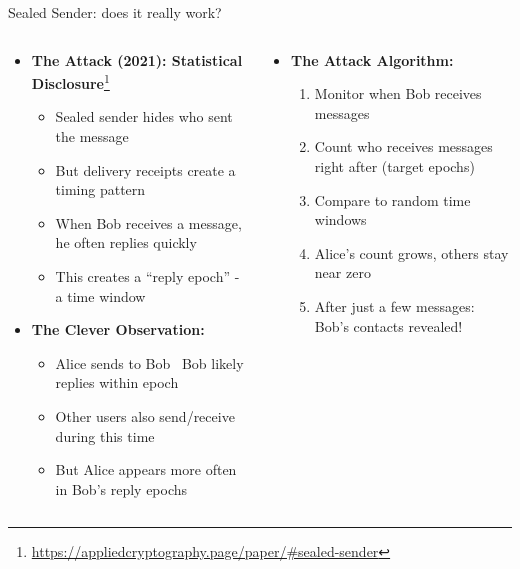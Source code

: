 \documentclass[aspectratio=169, lualatex, handout]{beamer}
\begin{document}
\begin{frame}{Sealed Sender: does it really work?}
	\begin{columns}[c]
		\begin{column}{0.6\textwidth}
			\begin{itemize}
				\item \textbf{The Attack (2021): Statistical Disclosure}\footnote{\url{https://appliedcryptography.page/paper/\#sealed-sender}}
				      \begin{itemize}
					      \item Sealed sender hides who sent the message
					      \item But delivery receipts create a timing pattern
					      \item When Bob receives a message, he often replies quickly
					      \item This creates a ``reply epoch'' - a time window
				      \end{itemize}
				\item \textbf{The Clever Observation:}
				      \begin{itemize}
					      \item Alice sends to Bob \rightarrow\ Bob likely replies within epoch
					      \item Other users also send/receive during this time
					      \item But Alice appears more often in Bob's reply epochs
				      \end{itemize}
			\end{itemize}
		\end{column}
		\begin{column}{0.4\textwidth}
			\begin{itemize}
				\item \textbf{The Attack Algorithm:}
				      \begin{enumerate}
					      \item Monitor when Bob receives messages
					      \item Count who receives messages right after (target epochs)
					      \item Compare to random time windows
					      \item Alice's count grows, others stay near zero
					      \item After just a few messages: Bob's contacts revealed!
				      \end{enumerate}
			\end{itemize}
		\end{column}
	\end{columns}
\end{frame}
\end{document}

